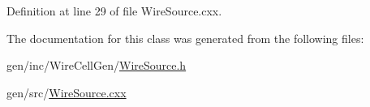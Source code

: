 Definition at line 29 of file Wire\+Source.\+cxx.



The documentation for this class was generated from the following files\+:\begin{DoxyCompactItemize}
\item 
gen/inc/\+Wire\+Cell\+Gen/\hyperlink{_wire_source_8h}{Wire\+Source.\+h}\item 
gen/src/\hyperlink{_wire_source_8cxx}{Wire\+Source.\+cxx}\end{DoxyCompactItemize}
